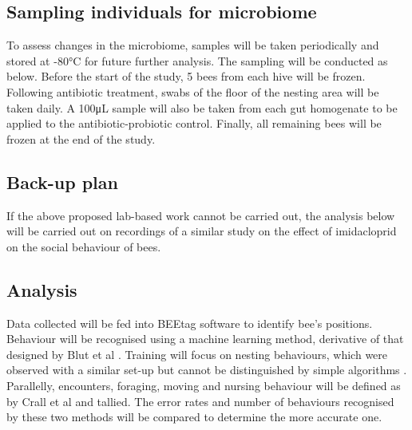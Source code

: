 \documentclass[11pt]{article} %
\begin{document}
        \subsection{Sampling individuals for microbiome}
            To assess changes in the microbiome,
            samples will be taken periodically and stored at \ang{-80}C for future further analysis.
            The sampling will be conducted as below.
            Before the start of the study,
            5 bees from each hive will be frozen.
            Following antibiotic treatment,
            swabs of the floor of the nesting area will be taken daily.
            A 100\si{\micro\liter} sample will also be taken from each gut homogenate to be applied to the antibiotic-probiotic control.
            Finally, all remaining bees will be frozen at the end of the study.
            
        \subsection{Back-up plan}
        If the above proposed lab-based work cannot be carried out,
        the analysis below will be carried out on recordings of a similar study on the effect of imidacloprid on the social behaviour of bees.
 
        \subsection{Analysis}
            Data collected will be fed into BEEtag software
            \parencite{crall2015beetag} to identify bee's positions.
            Behaviour will be recognised using a machine learning method,
            derivative of that designed by Blut et al
            \parencite*{blut2017automated}.
            Training will focus on nesting behaviours, which were observed with a similar set-up but cannot be distinguished by simple algorithms
            \parencite{crall2018neonicotinoid}.
            Parallelly,
            encounters, foraging, moving and nursing behaviour will be defined as by Crall et al
            \parencite*{crall2018neonicotinoid}
            and tallied.
            The error rates
            and number of behaviours recognised by these two methods will be compared to determine the more accurate one.
            
\end{document}
